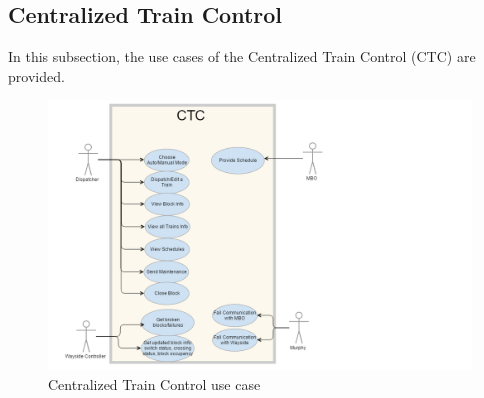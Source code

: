 \documentclass[]{article}
\begin{document}
\subsection{Centralized Train Control}
In this subsection, the use cases of the Centralized Train Control (CTC) are provided.
\begin{figure}[H]
	\centering
	\includegraphics[scale=.15]{ctcusecase.png}
	\caption{Centralized Train Control use case}
\end{figure}
\end{document}
